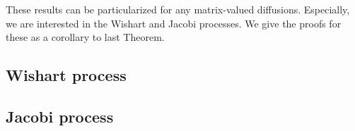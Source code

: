 These results can be particularized for any matrix-valued diffusions. Especially, we are interested in the Wishart and Jacobi processes. We give the proofs for these as a corollary to last Theorem.

\subsection{Wishart process}

\begin{corollary}

\end{corollary}


\subsection{Jacobi process}

\begin{corollary}

\end{corollary}